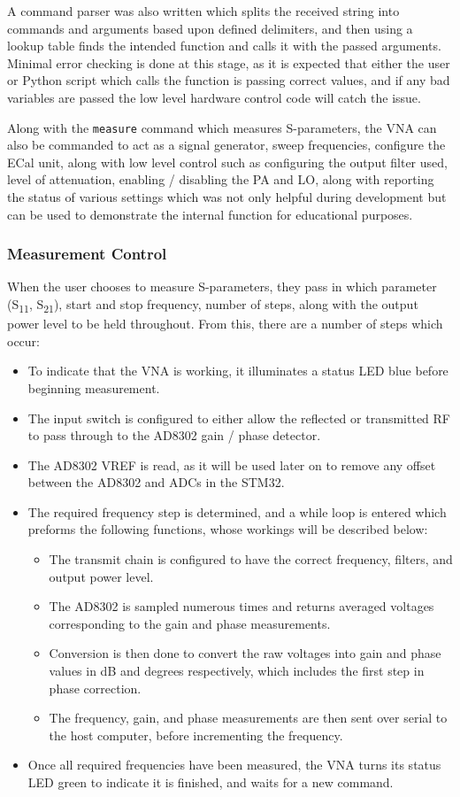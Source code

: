 A command parser was also written which splits the received string into commands and arguments based upon defined delimiters, and then using a lookup table finds the intended function and calls it with the passed arguments. Minimal error checking is done at this stage, as it is expected that either the user or Python script which calls the function is passing correct values, and if any bad variables are passed the low level hardware control code will catch the issue. 

Along with the \texttt{measure} command which measures S-parameters, the VNA can also be commanded to act as a signal generator, sweep frequencies, configure the ECal unit, along with low level control such as configuring the output filter used, level of attenuation, enabling / disabling the PA and LO, along with reporting the status of various settings which was not only helpful during development but can be used to demonstrate the internal function for educational purposes. 

\subsubsection{Measurement Control}
When the user chooses to measure S-parameters, they pass in which parameter (S\textsubscript{11}, S\textsubscript{21}), start and stop frequency, number of steps, along with the output power level to be held throughout. From this, there are a number of steps which occur:
\begin{itemize}
	\item To indicate that the VNA is working, it illuminates a status LED blue before beginning measurement.
	\item The input switch is configured to either allow the reflected or transmitted RF to pass through to the AD8302 gain / phase detector. 
	\item The AD8302 VREF is read, as it will be used later on to remove any offset between the AD8302 and ADCs in the STM32.
	\item The required frequency step is determined, and a while loop is entered which preforms the following functions, whose workings will be described below:
	\begin{itemize}
		\item The transmit chain is configured to have the correct frequency, filters, and output power level. 
		\item The AD8302 is sampled numerous times and returns averaged voltages corresponding to the gain and phase measurements. 
		\item Conversion is then done to convert the raw voltages into gain and phase values in dB and degrees respectively, which includes the first step in phase correction. 
		\item The frequency, gain, and phase measurements are then sent over serial to the host computer, before incrementing the frequency. 
	\end{itemize}
	\item Once all required frequencies have been measured, the VNA turns its status LED green to indicate it is finished, and waits for a new command. 
\end{itemize}

